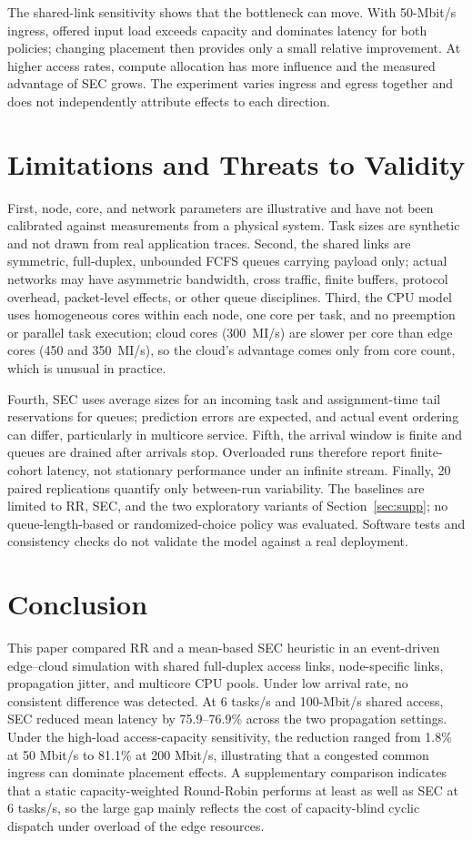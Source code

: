 \documentclass[conference]{IEEEtran}
\begin{document}
The shared-link sensitivity shows that the bottleneck can move. With 50-Mbit/s ingress, offered input load exceeds capacity and dominates latency for both policies; changing placement then provides only a small relative improvement. At higher access rates, compute allocation has more influence and the measured advantage of SEC grows. The experiment varies ingress and egress together and does not independently attribute effects to each direction.

\section{Limitations and Threats to Validity}
First, node, core, and network parameters are illustrative and have not been calibrated against measurements from a physical system. Task sizes are synthetic and not drawn from real application traces. Second, the shared links are symmetric, full-duplex, unbounded FCFS queues carrying payload only; actual networks may have asymmetric bandwidth, cross traffic, finite buffers, protocol overhead, packet-level effects, or other queue disciplines. Third, the CPU model uses homogeneous cores within each node, one core per task, and no preemption or parallel task execution; cloud cores (300~MI/s) are slower per core than edge cores (450 and 350~MI/s), so the cloud's advantage comes only from core count, which is unusual in practice.

Fourth, SEC uses average sizes for an incoming task and assignment-time tail reservations for queues; prediction errors are expected, and actual event ordering can differ, particularly in multicore service. Fifth, the arrival window is finite and queues are drained after arrivals stop. Overloaded runs therefore report finite-cohort latency, not stationary performance under an infinite stream. Finally, 20 paired replications quantify only between-run variability. The baselines are limited to RR, SEC, and the two exploratory variants of Section~\ref{sec:supp}; no queue-length-based or randomized-choice policy was evaluated. Software tests and consistency checks do not validate the model against a real deployment.

\section{Conclusion}
This paper compared RR and a mean-based SEC heuristic in an event-driven edge--cloud simulation with shared full-duplex access links, node-specific links, propagation jitter, and multicore CPU pools. Under low arrival rate, no consistent difference was detected. At 6 tasks/s and 100-Mbit/s shared access, SEC reduced mean latency by 75.9--76.9\% across the two propagation settings. Under the high-load access-capacity sensitivity, the reduction ranged from 1.8\% at 50 Mbit/s to 81.1\% at 200 Mbit/s, illustrating that a congested common ingress can dominate placement effects. A supplementary comparison indicates that a static capacity-weighted Round-Robin performs at least as well as SEC at 6 tasks/s, so the large gap mainly reflects the cost of capacity-blind cyclic dispatch under overload of the edge resources.
\end{document}
